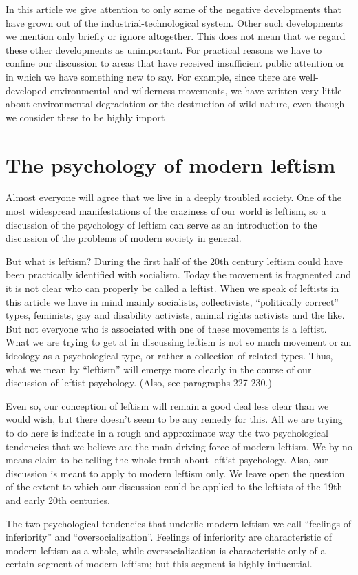 \documentclass{article}
\begin{document}
In this article we give attention to only some of the negative developments that have grown out 
of  the  industrial-technological  system.   Other  such  developments  we  mention  only  briefly  or  
ignore altogether.  This does not mean that we regard these other developments as unimportant. 
For practical reasons we have to confine our discussion to areas that have received 
insufficient public attention or in which we have something new to say.  For example, since there 
are well-developed environmental and wilderness movements, we have written very little about 
environmental degradation or the destruction of wild nature, even though we consider these to be 
highly import

\section{The psychology of modern leftism}
Almost  everyone  will  agree  that  we  live  in  a  deeply  troubled  society.   One  of  the  most  
widespread  manifestations  of  the  craziness  of  our  world  is  leftism,  so  a  discussion  of  the psychology of leftism can serve as an introduction to the discussion of the problems of modern 
society in general.

But what is leftism? During the first half of the 20th century leftism could have been practically 
identified with socialism.  Today the movement is fragmented and it is not clear who can properly 
be  called  a  leftist. When  we  speak  of  leftists  in  this  article  we  have  in  mind  mainly  socialists, collectivists,  “politically  correct”  types,  feminists,  gay  and  disability  activists, animal  rights activists  and  the  like.   But  not  everyone  who  is  associated  with  one  of  these  movements  is  a leftist.  What we are trying to get at in discussing leftism is not so much movement or an ideology as a psychological type, or rather a collection of related types.  Thus, what we mean by “leftism” will  emerge  more  clearly  in  the  course  of  our  discussion  of  leftist  psychology.   (Also,  see paragraphs 227-230.) 

Even so, our conception of leftism will remain a good deal less clear than we would wish, but 
there doesn’t seem to be any remedy for this.  All we are trying to do here is indicate in a rough 
and approximate way the two psychological tendencies that we believe are the main driving force 
of modern leftism.  We by no means claim to be telling the whole truth about leftist 
psychology.  Also, our discussion is meant to apply to modern leftism only.  We leave open the 
question of the extent to which our discussion could be applied to the leftists of the 19th and early 
20th centuries. 

The two psychological tendencies that underlie modern leftism we call “feelings of inferiority” 
and  “oversocialization”.  Feelings  of  inferiority  are  characteristic  of  modern  leftism  as  a  whole, while  oversocialization  is  characteristic  only  of  a  certain  segment  of  modern  leftism;  but  this  segment is highly influential. 
\end{document}
